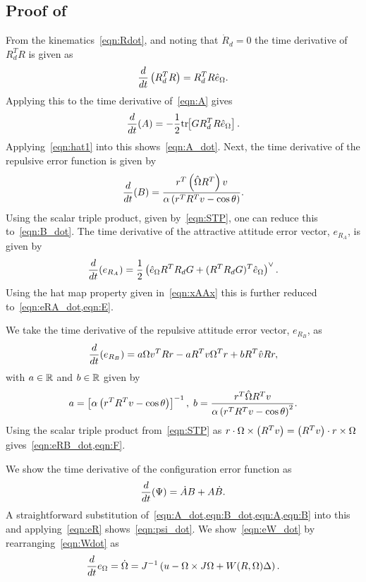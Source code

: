 \subsection{Proof of~}\label{proof:error_dyn}
From the kinematics~\cref{eqn:Rdot}, and noting that \( \dot{R}_d = 0 \) the time derivative of \( R_d^T R \) is given as
\begin{gather*}
	\frac{d }{d t} \left( R_d^T R \right) = R_d^T R \hat{e}_\Omega .
\end{gather*}
Applying this to the time derivative of~\cref{eqn:A} gives
\begin{gather*}
	\frac{d }{d t} (A) = -\frac{1}{2} \mathrm{tr}\negthickspace\left[ G R_d^T R \hat{e}_\Omega \right] .
\end{gather*}
Applying~\cref{eqn:hat1} into this shows~\cref{eqn:A_dot}.
Next, the time derivative of the repulsive error function is given by
\begin{gather*}
	\frac{d }{d t} (B) = \frac{r^T \left( \hat{\Omega} R^T \right) v}{\alpha \left( r^T R^T v - \cos \theta \right)} .
\end{gather*}
Using the scalar triple product, given by~\cref{eqn:STP}, one can reduce this to~\cref{eqn:B_dot}.
The time derivative of the attractive attitude error vector, \( e_{R_A} \), is given by
\begin{gather*}
	\frac{d }{d t} ( e_{R_A}) = \frac{1}{2} \left( \hat{e}_\Omega R^T R_d G + (R^T R_d G)^T \hat{e}_\Omega \right)^\vee .
\end{gather*}
Using the hat map property given in~\cref{eqn:xAAx} this is further reduced to~\cref{eqn:eRA_dot,eqn:E}.

We take the time derivative of the repulsive attitude error vector, \( e_{R_B} \), as
\begin{gather*}
	\frac{d }{d t}( e_{R_B} )= a \Omega v^T R r - a R^T v \Omega^T r + b R^T \hat{v} R r ,
\end{gather*}
with \( a \in \mathbb{R} \) and \( b \in \mathbb{R}\) given by 
\begin{gather*}
	a = \left[ \alpha \left( r^T R^T v - \cos \theta \right) \right]^{-1} , \;
	b = \frac{r^T \hat{\Omega} R^T v}{\alpha \left( r^T R^T v - \cos \theta \right)^2} .
\end{gather*}
Using the scalar triple product from~\cref{eqn:STP} as \( r \cdot \Omega \times \left( R^T v \right) = \left( R^T v \right) \cdot r \times \Omega \) gives~\cref{eqn:eRB_dot,eqn:F}.

We show the time derivative of the configuration error function as
\begin{gather*}
	\frac{d }{d t} (\Psi) = \dot{A} B + A \dot{B} .
\end{gather*}
A straightforward substitution of~\cref{eqn:A_dot,eqn:B_dot,eqn:A,eqn:B} into this and applying~\cref{eqn:eR} shows~\cref{eqn:psi_dot}.
We show~\cref{eqn:eW_dot} by rearranging~\cref{eqn:Wdot} as 
\begin{align*}
	\frac{d }{d t} e_\Omega = \dot{\Omega} = J^{-1} \left( u - \Omega \times J \Omega + W(R,\Omega) \Delta  \right) .
\end{align*}

